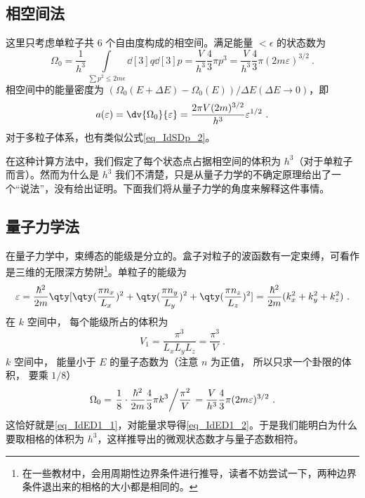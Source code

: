 
\subsection{相空间法}
这里只考虑单粒子共 $6$ 个自由度构成的相空间。满足能量 $<\epsilon$ 的状态数为
\begin{equation}\label{eq_IdED1_1}
\Omega_0 = \frac{1}{h^3}\int\limits_{\sum {p^2}  \leqslant 2m\epsilon} \dd[3]{q} \dd[3]{p}
 = \frac{V}{h^3}\frac43 \pi {p^3}
 = \frac{V}{h^3}\frac43 \pi (2m\varepsilon)^{3/2}~.
\end{equation}
相空间中的能量密度为 $(\Omega_0(E+\Delta E)-\Omega_0(E))/\Delta E(\Delta E\rightarrow 0)$，即
\begin{equation}\label{eq_IdED1_2}
a(\varepsilon) = \dv{\Omega_0}{\varepsilon} = \frac{2\pi V(2m)^{3/2}}{h^3} \varepsilon^{1/2}~.
\end{equation}
对于多粒子体系，也有类似公式\autoref{eq_IdSDp_2}。

在这种计算方法中，我们假定了每个状态点占据相空间的体积为 $h^3$（对于单粒子而言）。然而为什么是 $h^3$ 我们不清楚，只是从量子力学的不确定原理给出了一个“说法”，没有给出证明。下面我们将从量子力学的角度来解释这件事情。
\subsection{量子力学法}
在量子力学中，束缚态的能级是分立的。盒子对粒子的波函数有一定束缚，可看作是三维的无限深方势阱\footnote{在一些教材中，会用周期性边界条件进行推导，读者不妨尝试一下，两种边界条件退出来的相格的大小都是相同的。}。单粒子的能级为
\begin{equation}
\varepsilon = \frac{\hbar ^2}{2m} \qty[\qty(\frac{\pi n_x}{L_x})^2 + \qty(\frac{\pi n_y}{L_y})^2 + \qty(\frac{\pi n_z}{L_z})^2] = \frac{\hbar ^2}{2m} (k_x^2 + k_y^2 + k_z^2)~.
\end{equation}
在 $k$ 空间中， 每个能级所占的体积为
\begin{equation}
V_1 = \frac{\pi^3}{L_x L_y L_z} = \frac{\pi^3}{V}~.
\end{equation}
$k$ 空间中， 能量小于 $E$ 的量子态数为（注意 $n$ 为正值， 所以只求一个卦限的体积， 要乘 $1/8$）
\begin{equation}
\Omega_0 = \left. \frac18\cdot \frac{\hbar^2}{2m}\frac43 \pi k^3 \middle/ \frac{\pi^2}{V} \right. = \frac{V}{h^3}\frac43 \pi(2m\varepsilon)^{3/2}~.
\end{equation}
这恰好就是\autoref{eq_IdED1_1}，对能量求导得\autoref{eq_IdED1_2}。于是我们能明白为什么要取相格的体积为 $h^3$，这样推导出的微观状态数才与量子态数相符。
